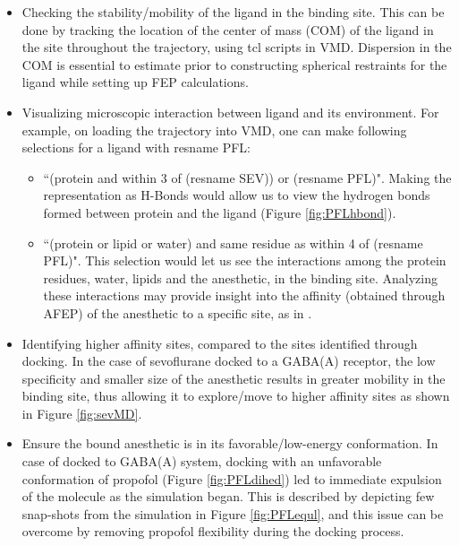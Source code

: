 \documentclass[12pt]{article}
\begin{document}
	\begin{itemize}
		\item Checking the stability/mobility of the ligand in the binding site. This can be done by tracking the location of the center of mass (COM) of the ligand in the site throughout the trajectory, using tcl scripts in VMD. Dispersion in the COM is essential to estimate prior to constructing spherical restraints for the ligand while setting up FEP calculations.
		\item Visualizing microscopic interaction between ligand and its environment. For example, on loading the trajectory into VMD, one can make following selections for a ligand with resname PFL:
			\begin{itemize}
				\item ``(protein and within 3 of (resname SEV)) or (resname PFL)". Making the representation as H-Bonds would allow us to view the hydrogen bonds formed between protein and the ligand (Figure \ref{fig:PFLhbond}).
				\item ``(protein or lipid or water) and same residue as within 4 of (resname PFL)". This selection would let us see the interactions among the protein residues, water, lipids and the anesthetic, in the binding site.
		Analyzing these interactions may provide insight into the affinity (obtained through AFEP) of the anesthetic to a specific site, as in \cite{Woll2016a}.  
			 \end{itemize}
		\item Identifying higher affinity sites, compared to the sites identified through docking. In the case of sevoflurane docked to a GABA(A) receptor, the low specificity and smaller size of the anesthetic results in greater mobility in the binding site, thus allowing it to explore/move to higher affinity sites as shown in Figure \ref{fig:sevMD}.
		\item Ensure the bound anesthetic is in its favorable/low-energy conformation.  In case of  docked to GABA(A) system, docking with an unfavorable conformation of propofol (Figure \ref{fig:PFLdihed}) led to immediate expulsion of the molecule as the simulation began. This is described by depicting few snap-shots from the simulation in Figure \ref{fig:PFLequl}, and this issue can be overcome by removing propofol flexibility during the docking process. %
	 \end{itemize}
	
\end{document}
